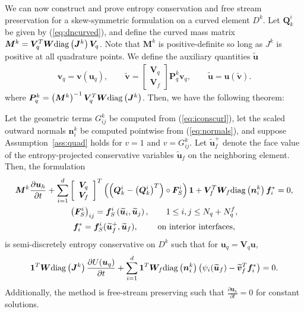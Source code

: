 \documentclass{svjour3}                     %
\renewcommand{\tilde}{\widetilde}
\newcommand{\diag}[1]{{\rm diag}\LRp{#1}}
\newcommand{\pd}[2]{\frac{\partial#1}{\partial#2}}
\newcommand{\LRp}[1]{\left( #1 \right)}
\newcommand{\LRs}[1]{\left[ #1 \right]}
\begin{document}
We can now construct and prove entropy conservation and free stream preservation for a skew-symmetric formulation on a curved element $D^k$.  Let $\bm{Q}^i_k$ be given by (\ref{eq:dncurved}), and define the curved mass matrix $\bm{M}^k = \bm{V}_q^T\bm{W}\diag{\bm{J}^k}\bm{V}_q$.  Note that $\bm{M}^k$ is positive-definite so long as $J^k$ is positive at all quadrature points.  We define the auxiliary quantities $\tilde{\bm{u}}$ 
\begin{gather*}
\bm{v}_q = \bm{v}\LRp{\bm{u}_q}, \qquad \tilde{\bm{v}} = \begin{bmatrix}
\bm{V}_q\\
\bm{V}_f
\end{bmatrix}\bm{P}^k_q\bm{v}_q, \qquad \tilde{\bm{u}} = \bm{u}\LRp{\tilde{\bm{v}}}.
\end{gather*}
where $\bm{P}^k_q = \LRp{\bm{M}^k}^{-1}\bm{V}_q^T\bm{W}\diag{\bm{J}^k}$.  Then, we have the following theorem:
\begin{theorem}
\label{thm:skewformcurved}
Let the geometric terms $G^k_{ij}$ be computed from (\ref{eq:iconscurl}), let the scaled outward normals $\bm{n}^k_i$ be computed pointwise from (\ref{eq:normals}), and suppose Assumption~\ref{ass:quad} holds for $v = 1$ and $v= G^k_{ij}$.  Let $\tilde{\bm{u}}_f^+$ denote the face value of the entropy-projected conservative variables $\tilde{\bm{u}}_f$ on the neighboring element.  Then, the formulation
\begin{gather}
\bm{M}^k\pd{\bm{u}_h}{t} + 
\sum_{i=1}^d \LRs{\begin{array}{cc}
\bm{V}_q \\
\bm{V}_f\end{array}}^T \LRp{\LRp{\bm{Q}^i_k - \LRp{\bm{Q}^i_k}^T} \circ \bm{F}^i_S}\bm{1} + \bm{V}_f^T \bm{W}_f \diag{{\bm{n}^k_i}}\bm{f}_i^* = 0, \label{eq:skewformcurved}\\
\LRp{\bm{F}^i_S}_{ij} = \bm{f}^i_S\LRp{\tilde{\bm{u}}_i,\tilde{\bm{u}}_j}, \qquad 1\leq i,j\leq N_q + N^f_q, \nonumber\\
\bm{f}_i^* = \bm{f}^i_S(\tilde{\bm{u}}_f^+,\tilde{\bm{u}}_f), \qquad \text{ on interior interfaces,} \nonumber
\end{gather}
is semi-discretely entropy conservative on $D^k$ such that for $\bm{u}_q = \bm{V}_q\bm{u}$,
\begin{gather*}
\bm{1}^T\bm{W}\diag{\bm{J}^k}\pd{U(\bm{u}_q)}{t} + \sum_{i=1}^d\bm{1}^T\bm{W}_f \diag{\bm{n}^k_i} \LRp{\psi_i(\tilde{\bm{u}}_f) - \tilde{\bm{v}}_f^T\bm{f}_i^*} = 0.
\end{gather*}
Additionally, the method is free-stream preserving such that $\pd{\bm{u}_h}{t} = 0$ for constant solutions.
\end{theorem}
\end{document}
